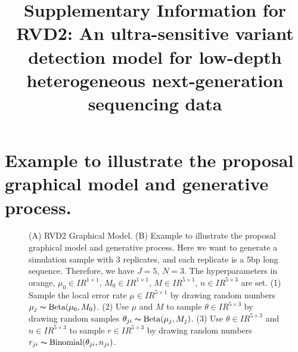 \documentclass[11pt,reqno]{amsart}
\title[RVD2: Supplementary Information]{Supplementary Information for
  RVD2: An ultra-sensitive variant detection model for low-depth heterogeneous next-generation sequencing data}
\newcommand{\RR}{I\!\!R} %
\begin{document}
\maketitle

\section{Example to illustrate the proposal graphical model and generative process.}\label{sec:appendix_example}

\begin{figure}[!bpth]
    \centering
    \quad
    \quad
    \caption{(A) RVD2 Graphical Model. (B) Example to illustrate the proposal graphical model and generative process. Here we want to generate a simulation sample with 3 replicates, and each replicate is a 5bp long sequence. Therefore, we have $ J = 5 $, $N = 3$. The hyperparameters in orange, $\mu_0 \in \RR^{1 \times 1}$, $M_0 \in \RR^{1 \times 1}$, $M \in \RR^{5 \times 1}$, $n \in \RR^{5 \times 3}$ are set. (1) Sample the local error rate $\mu \in \RR^{5 \times 1}$ by drawing random numbers $\mu_j \thicksim \text{Beta}(\mu_0, M_0)$. (2) Use $\mu $ and $ M $ to sample $\theta \in \RR^{5 \times 3}$ by drawing random samples $\theta_{ji} \thicksim \text{Beta}(\mu_j, M_j)$. (3) Use $\theta \in \RR^{5 \times 3}$ and $n \in \RR^{5 \times 3}$ to sample $r \in \RR^{5 \times 3}$ by drawing random numbers $r_{ji} \thicksim \text{Binomial}(\theta_{ji}, n_{ji})$.} 
    \label{fig:brca_MAF}%
\end{figure}
\end{document}

